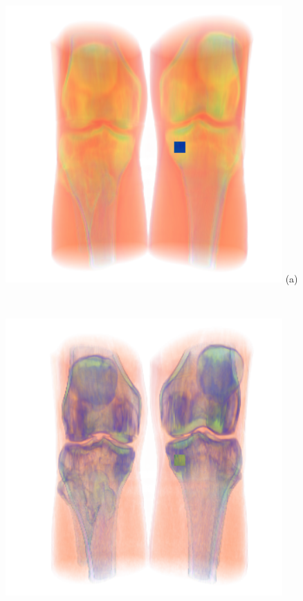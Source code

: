 \documentclass[twoside,twocolumn,10pt]{article}
\begin{document}
\begin{figure}
	\centering
	\begin{minipage}{.2\textwidth}
		\centering
		\includegraphics[width=1\linewidth]{CT-Knee_crop}
(a)
		\label{fig:CT-Knee}
	\end{minipage}~
	\begin{minipage}{.2\textwidth}
		\centering
		\includegraphics[width=1\linewidth]{CT-Knee_blue_crop}

\end{minipage}
\end{figure}
\end{document}

